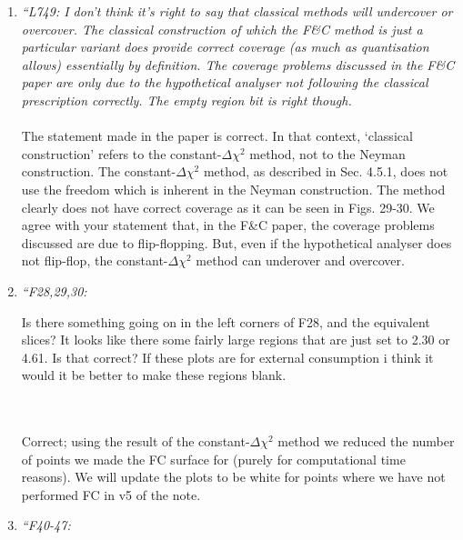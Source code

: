 \begin{enumerate}
\vspace{5 mm}
\item
{\em
	``L749:
I don't think it's right to say that classical methods will undercover or overcover. 
The classical construction of which the F\&C method is just a particular variant does provide correct coverage 
(as much as quantisation allows) essentially by definition. The coverage problems discussed in the F\&C paper are only 
due to the hypothetical analyser not following the classical prescription correctly.   The empty region bit is right though.
}\\
\\
The statement made in the paper is correct. 
In that context, `classical construction' refers to the constant-$\Delta \chi^2$ method, not to the Neyman construction.
The constant-$\Delta \chi^2$ method, as described in Sec. 4.5.1, does not use the freedom which is inherent in the Neyman construction.
The method clearly does not have correct coverage as it can be seen in Figs. 29-30.
We agree with your statement that, in the F\&C paper, the coverage problems discussed are due to flip-flopping.
But, even if the hypothetical analyser does not flip-flop, the constant-$\Delta \chi^2$ method can 
underover and overcover.

\vspace{5 mm}
\item
{\em
	``F28,29,30:

Is there something going on in the left corners of F28, and the equivalent slices? It looks like there some fairly large regions that are just set to 2.30 or 4.61. Is that correct?  If these plots are for external consumption i think it would it be better to make these regions blank.
}\\
\\
Correct; using the result of the constant-$\Delta \chi^2$ method we reduced the number of points we made the FC surface for (purely for computational time reasons).
We will update the plots to be white for points where we have not
performed FC in v5 of the note.

\vspace{5 mm}
\item
{\em
	``F40-47:

}
\end{enumerate}
